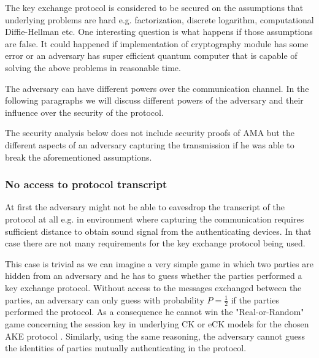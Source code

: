 \documentclass[11pt,titlepage]{article}
\theoremstyle{plain}
\begin{document}
The key exchange protocol is considered to be secured on the assumptions that underlying problems are hard e.g. factorization, discrete logarithm, computational Diffie-Hellman etc. One interesting question is what happens if those assumptions are false. It could happened if implementation of cryptography module has some error or an adversary has super efficient quantum computer that is capable of solving the above problems in reasonable time.

\vspace{5mm}

The adversary can have different powers over the communication channel. In the following paragraphs we will discuss different powers of the adversary and their influence over the security of the protocol.

\vspace{5mm}

The security analysis below does not include security proofs of AMA but the different aspects of an adversary capturing the transmission if he was able to break the aforementioned assumptions.

\subsubsection{No access to protocol transcript}
At first the adversary might not be able to eavesdrop the transcript of the protocol at all e.g. in environment where capturing the communication requires sufficient distance to obtain sound signal from the authenticating devices. In that case there are not many requirements for the key exchange protocol being used.

\vspace{5mm}

This case is trivial as we can imagine a very simple game in which two parties are hidden from an adversary and he has to guess whether the parties performed a key exchange protocol. Without access to the messages exchanged between the parties, an adversary can only guess with probability $P = \frac{1}{2}$ if the parties performed the protocol. As a consequence he cannot win the "Real-or-Random" game concerning the session key in underlying CK or eCK models for the chosen AKE protocol \cite{key_exchange, efficient_eck, security_canetti_krawczyk}. Similarly, using the same reasoning, the adversary cannot guess the identities of parties mutually authenticating in the protocol. 

\vspace{5mm}
\end{document}

